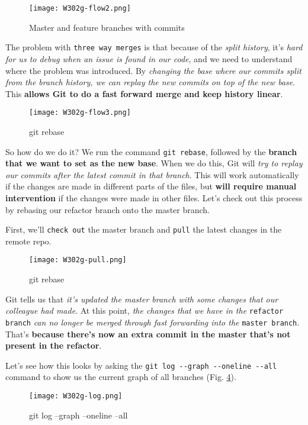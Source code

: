 \begin{figure} 
	\caption{Master and feature branches with commits}
	\centering
	\texttt{[image: W302g-flow2.png]}
	\label{W302g-flow2}
\end{figure}

The problem with \verb|three way merges| is that because of the \textit{split history}, it's \textit{hard for us to debug when an issue is found in our code}, and we need to understand where the problem was introduced. By \textit{changing the base where our commits split from the branch history, we can replay the new commits on top of the new base}. This \textbf{allows Git to do a fast forward merge and keep history linear}.

\begin{figure} 
	\caption{git rebase}
	\centering
	\texttt{[image: W302g-flow3.png]}
	\label{W302g-flow3}
\end{figure}


So how do we do it? We run the command \verb|git rebase|, followed by the \textbf{branch that we want to set as the new base}. When we do this, Git will \textit{try to replay our commits after the latest commit in that branch}. This will work automatically if the changes are made in different parts of the files, but \textbf{will require manual intervention} if the changes were made in other files.
Let's check out this process by rebasing our refactor branch onto the master branch. 

First, we'll \verb|check out| the master branch and \verb|pull| the latest changes in the remote repo.

\begin{figure} 
	\caption{git rebase}
	\centering
	\texttt{[image: W302g-pull.png]}
	\label{W302g-pull}
\end{figure}


Git tells us that \textit{it's updated the master branch with some changes that our colleague had made}. At this point, \textit{the changes that we have in the} \verb|refactor branch| \textit{can no longer be merged through fast forwarding into the} \verb|master branch|. That's \textbf{because there's now an extra commit in the master that's not present in the refactor}.

Let's see how this looks by asking the \verb|git log --graph --oneline --all| command to show us the current graph of all branches (Fig. \ref{W302g-log}).

\begin{figure} 
	\caption{git log --graph --oneline --all}
	\centering
	\texttt{[image: W302g-log.png]}
	\label{W302g-log}
\end{figure}

